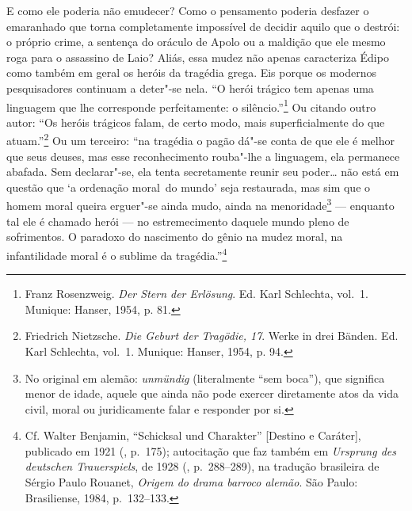 E como ele poderia não emudecer? Como o pensamento poderia desfazer o
emaranhado que torna completamente impossível de decidir aquilo que o destrói: o
próprio crime, a sentença do oráculo de Apolo ou a maldição que ele
mesmo roga para o assassino de Laio? Aliás, essa mudez não apenas caracteriza
Édipo como também em geral os heróis da tragédia grega. Eis
porque os modernos pesquisadores continuam a deter"-se nela. ``O herói
trágico tem apenas uma linguagem que lhe corresponde perfeitamente: o
silêncio.''\footnote{Franz Rosenzweig. \emph{Der Stern der
  Erlösung}. Ed. Karl Schlechta, vol.~1. Munique: Hanser, 1954, p. 81. \versal{[N.~O.]}}
Ou citando outro autor: ``Os heróis trágicos falam, de certo modo, mais
superficialmente do que atuam.''\footnote{Friedrich Nietzsche.
  \emph{Die Geburt der Tragödie, 17}. Werke in drei Bänden. Ed.
  Karl Schlechta, vol.~1. Munique: Hanser, 1954, p. 94. \versal{[N.~O.]}} Ou um terceiro: ``na
tragédia o pagão dá"-se conta de que ele é melhor que seus deuses, mas
esse reconhecimento rouba"-lhe a linguagem, ela permanece abafada. Sem
declarar"-se, ela tenta secretamente reunir seu poder\ldots{} não está em
questão que `a ordenação moral~do mundo' seja restaurada, mas sim que o
homem moral queira erguer"-se ainda mudo, ainda na menoridade\footnote{No original em alemão: \emph{unmündig} (literalmente ``sem boca''), que significa
  menor de idade, aquele que ainda não pode exercer diretamente atos da
  vida civil, moral ou juridicamente falar e responder por si. \versal{[N.~T.]}} ---
enquanto tal ele é chamado herói --- no estremecimento daquele mundo
pleno de sofrimentos. O paradoxo do nascimento do gênio na mudez moral,
na infantilidade moral é o sublime da tragédia.''\footnote{Cf.
  Walter Benjamin, ``Schicksal und Charakter'' {[}Destino e Caráter{]},
  publicado em 1921 (, p.~175); autocitação que faz também em
  \emph{Ursprung des deutschen Trauerspiels}, de 1928 (, p.~288--289),
  na tradução brasileira de Sérgio Paulo Rouanet, \emph{Origem do drama
  barroco alemão}. São Paulo: Brasiliense, 1984, p.~132--133. \versal{[N.~T.]}}

